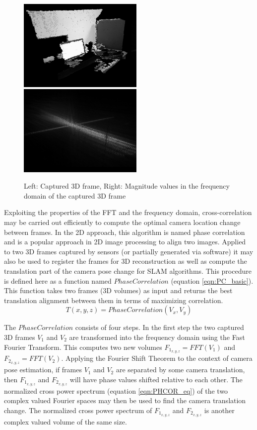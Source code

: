 \begin{figure}[!htb]
\centering
\includegraphics[width=6cm]{images/methodology/FVR/capFrameOriginal}
\includegraphics[width=6cm]{images/methodology/FVR/capFrameMagFFT}
\caption{Left: Captured 3D frame, Right: Magnitude values in the frequency domain of the captured 3D frame}
\label{fig:FrequencyDomainExample}
\end{figure}
 

Exploiting the properties of the FFT and the frequency domain, cross-correlation may be carried out efficiently to compute the optimal camera location change between frames. In the 2D approach, this algorithm is named phase correlation and is a popular approach in 2D image processing to align two images. Applied to two 3D frames captured by sensors (or partially generated via software) it may also be used to register the frames for 3D reconstruction as well as compute the translation part of the camera pose change for SLAM algorithms. This procedure is defined here as a function named $PhaseCorrelation$ (equation \ref{eqn:PC_basic}). This function takes two frames (3D volumes) as input and returns the best translation alignment between them in terms of maximizing correlation.  \\

\begin{equation} \label{eqn:PC_basic}
T(x, y, z) = PhaseCorrelation(V_x, V_y)
\end{equation}

The $PhaseCorrelation$ consists of four steps. In the first step the two captured 3D frames $V_1$ and $V_2$ are transformed into the frequency domain using the Fast Fourier Transform. This computes two new volumes $F_{1_{x,y,z}} = FFT(V_1)$ and $F_{2_{x,y,z}} = FFT(V_2)$. Applying the Fourier Shift Theorem to the context of camera pose estimation, if frames $V_1$ and $V_2$ are separated by some camera translation, then $F_{1_{x,y,z}}$ and $F_{2_{x,y,z}}$ will have phase values shifted relative to each other. The normalized cross power spectrum (equation \ref{eqn:PHCOR_eq}) of the two complex valued Fourier spaces may then be used to find the camera translation change. The normalized cross power spectrum of $F_{1_{x,y,z}}$ and $F_{2_{x,y,z}}$ is another complex valued volume of the same size. \\

